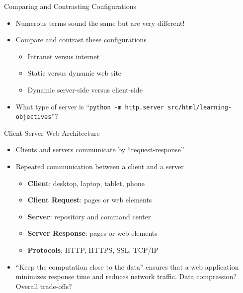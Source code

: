 \documentclass[14pt,aspectratio=169]{beamer}
\begin{document}
%
\begin{frame}{Comparing and Contrasting Configurations}
%
  \begin{itemize}
    \item Numerous terms sound the same but are very different!
    \item Compare and contrast these configurations
      \begin{itemize}
        \item Intranet versus internet
        \item Static versus dynamic web site
        \item Dynamic server-side versus client-side
      \end{itemize}
    \item What type of server is ``{\tt python -m http.server
      src/html/learning-objectives}''?
  \end{itemize}
%
\end{frame}

%
\begin{frame}{Client-Server Web Architecture}
  \begin{itemize}
    \item Clients and servers communicate by ``request-response''
      \vspace*{-.2in}
    \item Repeated communication between a client and a server
      \begin{itemize}
        \item {\bf Client}: desktop, laptop, tablet, phone
        \item {\bf Client Request}: pages or web elements
        \item {\bf Server}: repository and command center
        \item {\bf Server Response}: pages or web elements
        \item {\bf Protocols}: HTTP, HTTPS, SSL, TCP/IP
      \end{itemize}
      \vspace*{-.2in}
    \item ``Keep the computation close to the data''
      ensures that a web application minimizes response time and reduces
      network traffic. Data compression? Overall trade-offs?
  \end{itemize}
\end{frame}
\end{document}
